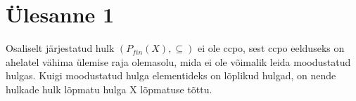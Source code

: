 \section{Ülesanne 1}

Osaliselt järjestatud hulk \( (P_{fin}(X), \subseteq) \) ei ole ccpo, sest ccpo
eelduseks on ahelatel vähima ülemise raja olemasolu, mida ei ole võimalik leida
moodustatud hulgas. Kuigi moodustatud hulga elementideks on lõplikud hulgad, on
nende hulkade hulk lõpmatu hulga X lõpmatuse tõttu.


